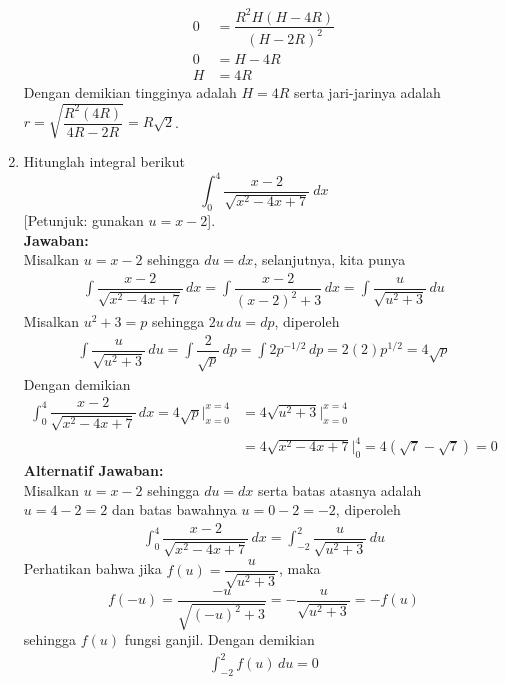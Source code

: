 \documentclass{article}
\begin{document}
\begin{enumerate}
\begin{align*}
	0 &= \dfrac{R^2H(H-4R)}{(H-2R)^2}\\
	0 &= H-4R\\
	H &= 4R
	\end{align*}
	Dengan demikian tingginya adalah $H=4R$ serta jari-jarinya adalah $r=\sqrt{\dfrac{R^2(4R)}{4R-2R}} = R\sqrt{2}$.
	\item Hitunglah integral berikut 
	$$ \int_0^4 \dfrac{x-2}{\sqrt{x^2-4x+7}}~ dx $$
	[Petunjuk: gunakan $u=x-2$].\\
	\textbf{Jawaban:}\\
	Misalkan $u=x-2$ sehingga $du = dx$, selanjutnya, kita punya 
	\begin{align*}
	\int \dfrac{x-2}{\sqrt{x^2-4x+7}} \, dx = \int \dfrac{x-2}{(x-2)^2+3}\, dx = \int \dfrac{u}{\sqrt{u^2+3}}\, du
	\end{align*}
	Misalkan $u^2+3=p$ sehingga $2u \, du = dp$, diperoleh 
	\begin{align*}
	\int \dfrac{u}{\sqrt{u^2+3}} \, du = \int \dfrac{2}{\sqrt{p}}\, dp = \int 2p^{-1/2} \, dp = 2(2)p^{1/2} = 4\sqrt{p}
	\end{align*}
	Dengan demikian 
	\begin{align*}
	\int_0^4 \dfrac{x-2}{\sqrt{x^2-4x+7}}\, dx = 4\sqrt{p}\bigg|^{x=4}_{x=0} &= 4\sqrt{u^2+3}\bigg|^{x=4}_{x=0} \\
	&= 4\sqrt{x^2-4x+7}\bigg|^4_0 = 4(\sqrt{7}-\sqrt{7}) = 0
	\end{align*}
	\textbf{Alternatif Jawaban:}\\
	Misalkan $u=x-2$ sehingga $du=dx$ serta batas atasnya adalah $u=4-2=2$ dan batas bawahnya $u=0-2=-2$, diperoleh 
	\begin{align*}
	\int_0^4 \dfrac{x-2}{\sqrt{x^2-4x+7}}\, dx = \int_{-2}^2 \dfrac{u}{\sqrt{u^2+3}} \, du
	\end{align*}
	Perhatikan bahwa jika $f(u)=\dfrac{u}{\sqrt{u^2+3}}$, maka 
	$$f(-u)=\dfrac{-u}{\sqrt{(-u)^2+3}}=-\dfrac{u}{\sqrt{u^2+3}}=-f(u)$$ sehingga $f(u)$ fungsi ganjil. Dengan demikian
	\begin{align*}
	\int_{-2}^2 f(u) \, du = 0
	\end{align*}
\end{enumerate}
\newpage
\end{document}
